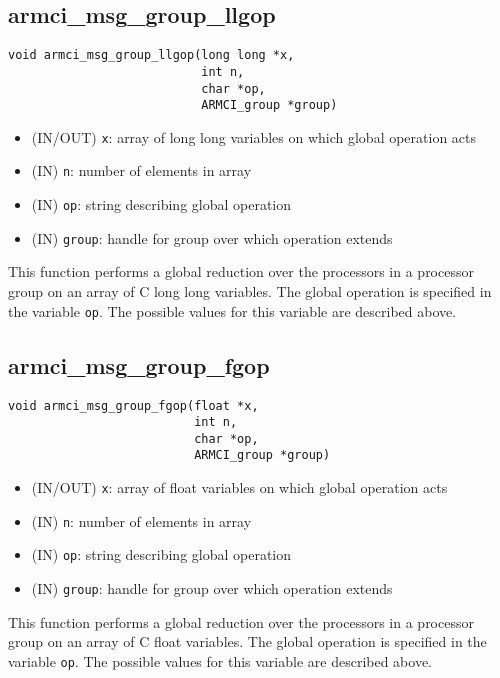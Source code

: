 \documentclass[12pt]{article}
\begin{document}
\subsection{armci\_msg\_group\_llgop}
\begin{verbatim}
void armci_msg_group_llgop(long long *x,
                           int n,
                           char *op,
                           ARMCI_group *group)
\end{verbatim}
\begin{itemize}
\item (IN/OUT) \texttt{x}: array of long long variables on which global operation acts
\item (IN) \texttt{n}: number of elements in array
\item (IN) \texttt{op}: string describing global operation
\item (IN) \texttt{group}: handle for group over which operation extends
\end{itemize}
This function performs a global reduction over the processors in a processor
group on an array of C long long variables. The global
operation is specified in the variable \texttt{op}. The possible values for this
variable are described above.

\subsection{armci\_msg\_group\_fgop}
\begin{verbatim}
void armci_msg_group_fgop(float *x,
                          int n,
                          char *op,
                          ARMCI_group *group)
\end{verbatim}
\begin{itemize}
\item (IN/OUT) \texttt{x}: array of float variables on which global operation acts
\item (IN) \texttt{n}: number of elements in array
\item (IN) \texttt{op}: string describing global operation
\item (IN) \texttt{group}: handle for group over which operation extends
\end{itemize}
This function performs a global reduction over the processors in a processor
group on an array of C float variables. The global
operation is specified in the variable \texttt{op}. The possible values for this
variable are described above.
\end{document}
